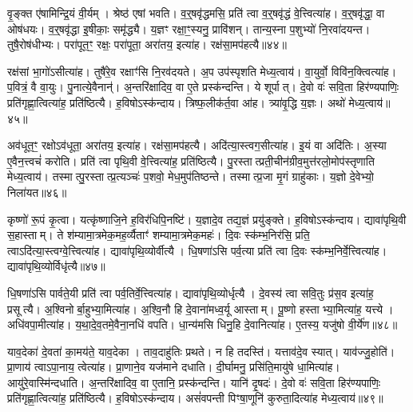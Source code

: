 वृ॒ङ्क्त ए॑षामिन्द्रि॒यं वी॒र्यम्।
श्रेष्ठ॑ एषां भवति।
व॒र्॒षवृ॑द्धमसि॒ प्रति॑ त्वा व॒र्॒षवृ॑द्धं वे॒त्त्वित्या॑ह।
व॒र्॒षवृ॑द्धा॒ वा ओष॑धयः।
व॒र्॒षवृ॑द्धा इ॒षीकाः॒ समृ॑द्ध्यै।
य॒ज्ञꣳ रक्षा॒ꣳ॒स्यनु॒ प्रावि॑शन्।
तान्य॒स्ना प॒शुभ्यो॑ नि॒रवा॑दयन्त।
तुषै॒रोष॑धीभ्यः।
परा॑पूत॒ꣳ॒ रक्षः॒ परा॑पूता॒ अरा॑तय॒ इत्या॑ह।
रक्ष॑सा॒मप॑हत्यै॥४४॥

रक्ष॑सां भा॒गो॑\-ऽसीत्या॑ह।
तुषै॑रे॒व रक्षाꣳ॑सि नि॒रव॑दयते।
अ॒प उप॑स्पृशति मेध्य॒त्वाय॑।
वा॒युर्वो॒ विवि॑न॒क्त्वित्या॑ह।
प॒वित्रं॒ वै वा॒युः।
पु॒नात्ये॒वैनान्॑।
अ॒न्तरि॑क्षादिव॒ वा ए॒ते प्रस्क॑न्दन्ति।
ये शूर्पात्।
दे॒वो वः॑ सवि॒ता हिर॑ण्यपाणिः॒ प्रति॑\-गृह्णा॒त्वित्या॑ह॒ प्रति॑ष्ठित्यै।
ह॒विषो\-ऽस्क॑न्दाय।
त्रिष्फ॒लीक॑र्त॒वा आ॑ह।
त्र्या॑वृ॒द्धि य॒ज्ञः।
अथो॑ मेध्य॒त्वाय॑॥४५॥\anuvakamend[द्वाभ्या॒मुत्पु॑नाति र॒श्मयो॑ नय॒न्त्यग्रे॑ य॒ज्ञप॑तिं य॒ज्ञो\-ऽदि॑ति॒रस्क॑न्दाय गृह्णा॒मीत्या॑ह व॒देत्या॑ह॒ विजि॑त्या॒ अप॑हत्या॒ अस्क॑न्दाय॒ त्रीणि॑ च]

अव॑धूत॒ꣳ॒ रक्षो\-ऽव॑धूता॒ अरा॑तय॒ इत्या॑ह।
रक्ष॑सा॒मप॑हत्यै।
अदि॑त्या॒स्त्वग॒सीत्या॑ह।
इ॒यं वा अदि॑तिः।
अ॒स्या ए॒वैन॒त्त्वचं॑ करोति।
प्रति॑ त्वा पृथि॒वी वे॒त्त्वित्या॑ह॒ प्रति॑ष्ठित्यै।
पु॒रस्तात्प्रती॒चीन॑ग्रीव॒मुत्त॑रलो॒मोप॑स्तृणाति मेध्य॒त्वाय॑।
तस्मात्पु॒रस्तात्प्र॒त्यञ्चः॑ प॒शवो॒ मेध॒मुप॑तिष्ठन्ते।
तस्मात्प्र॒जा मृ॒गं ग्राहु॑काः।
य॒ज्ञो दे॒वेभ्यो॒ निला॑यत॥४६॥

कृष्णो॑ रू॒पं कृ॒त्वा।
यत्कृ॑ष्णाजि॒ने ह॒विर॑धिपि॒नष्टि॑।
य॒ज्ञादे॒व तद्य॒ज्ञं प्रयु॑ङ्क्ते।
ह॒विषो\-ऽस्क॑न्दाय।
द्यावा॑पृथि॒वी स॒हास्ताम्।
ते श॑म्यामा॒त्रमेक॒मह॒र्व्यैताꣳ॑ शम्यामा॒त्रमेक॒महः॑।
दि॒वः स्क॑म्भ॒निर॑सि॒ प्रति॒ त्वा\-ऽदि॑त्या॒स्त्वग्वे॒त्त्वित्या॑ह।
द्यावा॑पृथि॒व्योर्वीत्यै।
धि॒षणा॑ऽसि पर्व॒त्या प्रति॑ त्वा दि॒वः स्क॑म्भ॒निर्वे॒त्त्वित्या॑ह।
द्यावा॑पृथि॒व्योर्विधृ॑त्यै॥४७॥

धि॒षणा॑ऽसि पार्वते॒यी प्रति॑ त्वा पर्व॒तिर्वे॒त्त्वित्या॑ह।
द्यावा॑पृथि॒व्योर्धृत्यै।
दे॒वस्य॑ त्वा सवि॒तुः प्र॑स॒व इत्या॑ह॒ प्रसूत्यै।
अ॒श्विनोर्बा॒हुभ्या॒मित्या॑ह।
अ॒श्वि॒नौ हि दे॒वाना॑मध्व॒र्यू आस्ताम्।
पू॒ष्णो हस्ताभ्या॒मित्या॑ह॒ यत्त्ये।
अधि॑वपा॒मीत्या॑ह।
य॒था॒दे॒व॒तमे॒वैना॒नधि॑ वपति।
धा॒न्य॑मसि धिनु॒हि दे॒वानित्या॑ह।
ए॒तस्य॒ यजु॑षो वी॒र्ये॑ण॥४८॥

याव॒देका॑ दे॒वता॑ का॒मय॑ते॒ याव॒देका।
ताव॒दाहु॑तिः प्रथते।
न हि तदस्ति॑।
यत्ताव॑दे॒व स्यात्।
याव॑ज्जु॒होति॑।
प्रा॒णाय॑ त्वा\-ऽपा॒नाय॒ त्वेत्या॑ह।
प्रा॒णाने॒व यज॑माने दधाति।
दी॒र्घामनु॒ प्रसि॑ति॒मायु॑षे धा॒मित्या॑ह।
आयु॑रे॒वास्मि॑न्दधाति।
अ॒न्तरि॑क्षादिव॒ वा ए॒तानि॒ प्रस्क॑न्दन्ति।
यानि॑ दृ॒षदः॑।
दे॒वो वः॑ सवि॒ता हिर॑ण्यपाणिः॒ प्रति॑गृह्णा॒त्वित्या॑ह॒ प्रति॑ष्ठित्यै।
ह॒विषो\-ऽस्क॑न्दाय।
असं॑वपन्ती पिꣳषा॒णूनि॑ कुरुता॒दित्या॑ह मेध्य॒त्वाय॑॥४९॥\anuvakamend[निला॑यत॒ विधृ॑त्यै वी॒र्ये॑ण स्कन्दन्ति च॒त्वारि॑ च]


